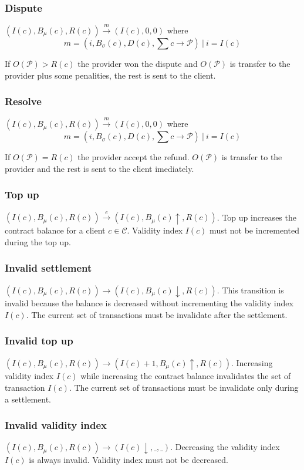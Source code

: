 \documentclass{llncs}
\begin{document}
\subsubsection{Dispute} $(I(c), B_\mu(c),R(c)) \xrightarrow{m} (I(c), 0, 0)$ where
$$m = (i, B_\sigma(c), D(c), \textstyle\sum c \rightarrow \mathcal{P})\ |\ i = I(c)$$

If $O(\mathcal{P}) > R(c)$ the provider won the dispute and $O(\mathcal{P})$ is transfer to the provider plus some penalities, the rest is sent to the client.

\subsubsection{Resolve} $(I(c), B_\mu(c),R(c)) \xrightarrow{m} (I(c), 0, 0)$ where
$$m = (i, B_\sigma(c), D(c), \textstyle\sum c \rightarrow \mathcal{P})\ |\ i = I(c)$$

If $O(\mathcal{P}) = R(c)$ the provider accept the refund. $O(\mathcal{P})$ is transfer to the provider and the rest is sent to the client imediately.

\subsubsection{Top up} $(I(c), B_\mu(c),R(c)) \xrightarrow{e} (I(c), B_\mu(c)\uparrow,R(c))$. Top up increases the contract balance for a client $c \in \mathcal{C}$. Validity index $I(c)$ must not be incremented during the top up.

\subsubsection{Invalid settlement} $(I(c), B_\mu(c),R(c)) \rightarrow (I(c), B_\mu(c)\downarrow,R(c))$. This transition is invalid because the balance is decreased without incrementing the validity index $I(c)$. The current set of transactions must be invalidate after the settlement.

\subsubsection{Invalid top up} $(I(c), B_\mu(c),R(c)) \rightarrow (I(c)+1, B_\mu(c)\uparrow,R(c))$. Increasing validity index $I(c)$ while increasing the contract balance invalidates the set of transaction $I(c)$. The current set of transactions must be invalidate only during a settlement.

\subsubsection{Invalid validity index} $(I(c), B_\mu(c),R(c)) \rightarrow (I(c)\downarrow, \_, \_)$. Decreasing the validity index $I(c)$ is always invalid. Validity index must not be decreased.
\end{document}
